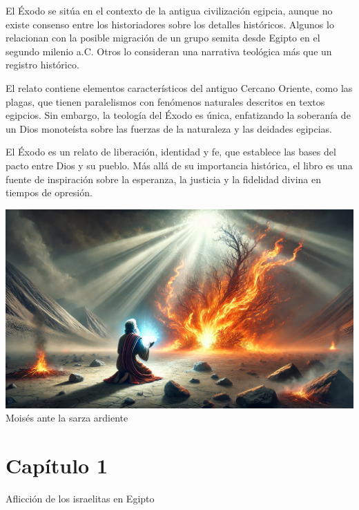 El Éxodo se sitúa en el contexto de la antigua civilización egipcia, aunque no existe consenso entre los historiadores sobre los detalles históricos. Algunos lo relacionan con la posible migración de un grupo semita desde Egipto en el segundo milenio a.C. Otros lo consideran una narrativa teológica más que un registro histórico.

El relato contiene elementos característicos del antiguo Cercano Oriente, como las plagas, que tienen paralelismos con fenómenos naturales descritos en textos egipcios. Sin embargo, la teología del Éxodo es única, enfatizando la soberanía de un Dios monoteísta sobre las fuerzas de la naturaleza y las deidades egipcias.



El Éxodo es un relato de liberación, identidad y fe, que establece las bases del pacto entre Dios y su pueblo. Más allá de su importancia histórica, el libro es una fuente de inspiración sobre la esperanza, la justicia y la fidelidad divina en tiempos de opresión.

	\begin{center}
		\includegraphics[width=0.99\linewidth]{graficas/exodo}\\
	Moisés ante la sarza ardiente 
	\end{center}



\section*{Capítulo 1}
Aflicción de los israelitas en Egipto  




